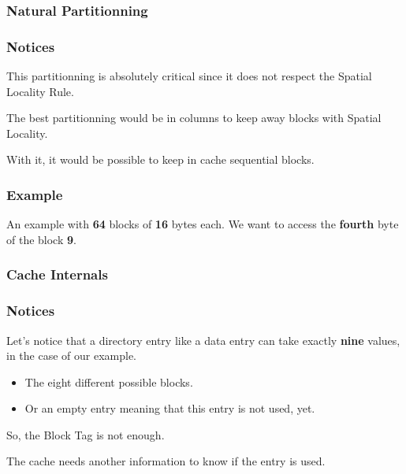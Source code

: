 
\begin{frame}
  \frametitle{Natural Partitionning}

  \begin{center}
  \end{center}
\end{frame}


\begin{frame}
  \frametitle{Notices}

  This partitionning is absolutely critical since it does not respect
  the Spatial Locality Rule.

  \-

  The best partitionning would be in columns to keep away blocks with
  Spatial Locality.

  \-

  With it, it would be possible to keep in cache sequential blocks.
\end{frame}


\begin{frame}
  \frametitle{Example}

  An example with \textbf{64} blocks of \textbf{16} bytes each. We want
  to access the \textbf{fourth} byte of the block \textbf{9}.

  \begin{center}
  \end{center}
\end{frame}


\begin{frame}
  \frametitle{Cache Internals}

  \begin{center}
  \end{center}
\end{frame}


\begin{frame}
  \frametitle{Notices}

  Let's notice that a directory entry like a data entry can take exactly
  \textbf{nine} values, in the case of our example.

  \begin{itemize}
    \item
      The eight different possible blocks.
    \item
      Or an empty entry meaning that this entry is not used, yet.
  \end{itemize}

  So, the Block Tag is not enough.

  \-

  The cache needs another information to know if the entry is used.
\end{frame}


